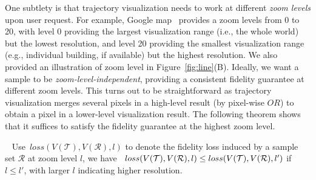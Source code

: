 One subtlety is that trajectory visualization needs to work at different \textit{zoom levels} upon user request. For example, Google map~\cite{googlemap} provides a zoom levels from 0 to 20, with level 0 providing the largest visualization range (i.e., the whole world) but the lowest resolution, and level 20 providing the smallest visualization range (e.g., individual building, if available) but the highest resolution. We also provided an illustration of zoom level in Figure~\ref{fig:line}(B). Ideally, we want a sample to be \textit{zoom-level-independent}, providing a consistent fidelity guarantee at different zoom levels. This turns out to be straightforward as trajectory visualization merges several pixels in a high-level result (by pixel-wise $OR$) to obtain a pixel in a lower-level visualization result. The following theorem shows that it suffices to satisfy the fidelity guarantee at the highest zoom level.
\begin{theorem}~\label{the:level}
	Use~$loss(V(\mathcal{T}), V(\mathcal{R}), l)$ to denote the fidelity loss induced by a sample set $\mathcal{R}$ at zoom level $l$, we have~ $loss(V(\mathcal{T}), V(\mathcal{R}), l) \\ \le loss(V(\mathcal{T}), V(\mathcal{R}), l')$ if $l\le l'$, with larger $l$ indicating higher resolution.
\end{theorem}


